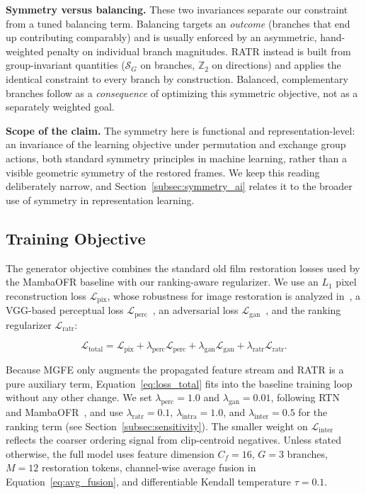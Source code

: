 \textbf{Symmetry versus balancing.} These two invariances separate our constraint from a tuned balancing term. Balancing targets an \emph{outcome} (branches that end up contributing comparably) and is usually enforced by an asymmetric, hand-weighted penalty on individual branch magnitudes. RATR instead is built from group-invariant quantities ($\mathcal{S}_G$ on branches, $\mathbb{Z}_2$ on directions) and applies the identical constraint to every branch by construction. Balanced, complementary branches follow as a \emph{consequence} of optimizing this symmetric objective, not as a separately weighted goal.

\textbf{Scope of the claim.} The symmetry here is functional and representation-level: an invariance of the learning objective under permutation and exchange group actions, both standard symmetry principles in machine learning, rather than a visible geometric symmetry of the restored frames. We keep this reading deliberately narrow, and Section~\ref{subsec:symmetry_ai} relates it to the broader use of symmetry in representation learning.

\subsection{Training Objective}
\label{subsec:training_objective}

The generator objective combines the standard old film restoration losses used by the MambaOFR baseline with our ranking-aware regularizer. We use an $L_1$ pixel reconstruction loss $\mathcal{L}_{\mathrm{pix}}$, whose robustness for image restoration is analyzed in~\cite{zhao2017loss_restoration}, a VGG-based perceptual loss $\mathcal{L}_{\mathrm{perc}}$~\cite{johnson2016perceptual}, an adversarial loss $\mathcal{L}_{\mathrm{gan}}$~\cite{goodfellow2014gan}, and the ranking regularizer $\mathcal{L}_{\mathrm{ratr}}$:

\begin{equation}
\mathcal{L}_{\mathrm{total}} =
\mathcal{L}_{\mathrm{pix}}
+ \lambda_{\mathrm{perc}}\mathcal{L}_{\mathrm{perc}}
+ \lambda_{\mathrm{gan}}\mathcal{L}_{\mathrm{gan}}
+ \lambda_{\mathrm{ratr}}\mathcal{L}_{\mathrm{ratr}}.
\label{eq:loss_total}
\end{equation}

Because MGFE only augments the propagated feature stream and RATR is a pure auxiliary term, Equation~\eqref{eq:loss_total} fits into the baseline training loop without any other change. We set $\lambda_{\mathrm{perc}}=1.0$ and $\lambda_{\mathrm{gan}}=0.01$, following RTN~\cite{wan2022rtn} and MambaOFR~\cite{mao2025mambaofr}, and use $\lambda_{\mathrm{ratr}}=0.1$, $\lambda_{\mathrm{intra}}=1.0$, and $\lambda_{\mathrm{inter}}=0.5$ for the ranking term (see Section~\ref{subsec:sensitivity}). The smaller weight on $\mathcal{L}_{\text{inter}}$ reflects the coarser ordering signal from clip-centroid negatives. Unless stated otherwise, the full model uses feature dimension $C_f=16$, $G=3$ branches, $M=12$ restoration tokens, channel-wise average fusion in Equation~\eqref{eq:avg_fusion}, and differentiable Kendall temperature $\tau=0.1$.
